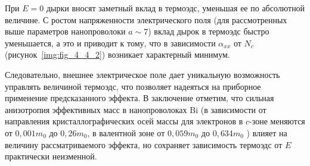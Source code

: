 При $E=0$ дырки вносят заметный вклад в термоэдс, уменьшая ее по абсолютной величине. С ростом напряженности электрического поля (для рассмотренных выше параметров нанопроволоки $a\sim 7$) вклад дырок в термоэдс быстро уменьшается, а это и приводит к тому, что в зависимости $\alpha_{xx} $ от $N_c $ (рисунок~\ref{img:fig_4_4_2}) возникает характерный минимум.

Следовательно, внешнее электрическое поле дает уникальную возможность управлять величиной термоэдс, что позволяет надеяться  на приборное применение предсказанного эффекта. В заключение отметим, что сильная анизотропия эффективных масс в нанопроволоках Bi (в зависимости от направления кристаллографических осей массы для электронов в $c$-зоне меняются от $0,001 m_0 $ до $0,26 m_0 $, в валентной зоне от $0,059m_0 $ до $0,634m_0 $ \cite{Levin2009a}) влияет на величину рассматриваемого эффекта, но сохраняет зависимость термоэдс от $E$ практически неизменной.
